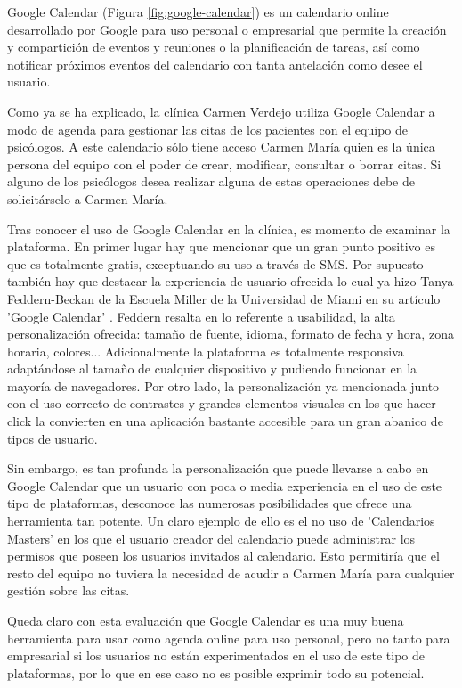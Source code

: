 Google Calendar (Figura \ref{fig:google-calendar}) es un calendario online desarrollado por Google para uso personal o empresarial que permite la creación y compartición de eventos y reuniones o la planificación de tareas, así como notificar próximos eventos del calendario con tanta antelación como desee el usuario. \bigskip

Como ya se ha explicado, la clínica Carmen Verdejo utiliza Google Calendar a modo de agenda para gestionar las citas de los pacientes con el equipo de psicólogos. A este calendario sólo tiene acceso Carmen María quien es la única persona del equipo con el poder de crear, modificar, consultar o borrar citas. Si alguno de los psicólogos desea realizar alguna de estas operaciones debe de solicitárselo a Carmen María. \bigskip

Tras conocer el uso de Google Calendar en la clínica, es momento de examinar la plataforma. En primer lugar hay que mencionar que un gran punto positivo es que es totalmente gratis, exceptuando su uso a través de SMS. Por supuesto también hay que destacar la experiencia de usuario ofrecida lo cual ya hizo Tanya Feddern-Beckan de la Escuela Miller de la Universidad de Miami en su artículo 'Google Calendar' \cite{FeddernBekcan2008}. Feddern resalta en lo referente a usabilidad, la alta personalización ofrecida: tamaño de fuente, idioma, formato de fecha y hora, zona horaria, colores... Adicionalmente la plataforma es totalmente responsiva adaptándose al tamaño de cualquier dispositivo y pudiendo funcionar en la mayoría de navegadores. Por otro lado, la personalización ya mencionada junto con el uso correcto de contrastes y grandes elementos visuales en los que hacer click la convierten en una aplicación bastante accesible para un gran abanico de tipos de usuario. \bigskip

Sin embargo, es tan profunda la personalización que puede llevarse a cabo en Google Calendar que un usuario con poca o media experiencia en el uso de este tipo de plataformas, desconoce las numerosas posibilidades que ofrece una herramienta tan potente. Un claro ejemplo de ello es el no uso de 'Calendarios Masters' en los que el usuario creador del calendario puede administrar los permisos que poseen los usuarios invitados al calendario. Esto permitiría que el resto del equipo no tuviera la necesidad de acudir a Carmen María para cualquier gestión sobre las citas. \bigskip

Queda claro con esta evaluación que Google Calendar es una muy buena herramienta para usar como agenda online para uso personal, pero no tanto para empresarial si los usuarios no están experimentados en el uso de este tipo de plataformas, por lo que en ese caso no es posible exprimir todo su potencial.

